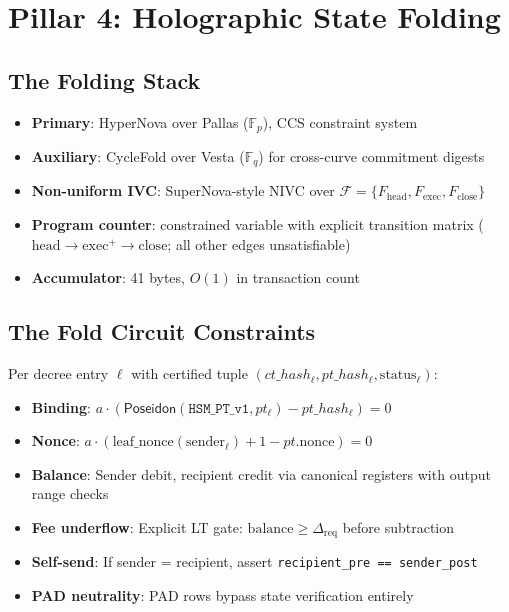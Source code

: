 \documentclass[11pt, a4paper]{article}
\theoremstyle{plain}
\theoremstyle{definition}
\theoremstyle{remark}
\newcommand{\fieldp}{\mathbb{F}_p}
\newcommand{\fieldq}{\mathbb{F}_q}
\begin{document}
\section{Pillar 4: Holographic State Folding}
\label{sec:folding}

\subsection{The Folding Stack}

\begin{itemize}
\item \textbf{Primary}: HyperNova over Pallas ($\fieldp$), CCS
constraint system
\item \textbf{Auxiliary}: CycleFold over Vesta ($\fieldq$) for
cross-curve commitment digests
\item \textbf{Non-uniform IVC}: SuperNova-style NIVC over
 $\mathcal{F} = \{F_{\text{head}}, F_{\text{exec}}, F_{\text{close}}\}$ \item \textbf{Program counter}: constrained variable with explicit
transition matrix ($\text{head} \to \text{exec}^+ \to \text{close}$;
all other edges unsatisfiable)
\item \textbf{Accumulator}: 41 bytes, $O(1)$ in transaction count
\end{itemize}

\subsection{The Fold Circuit Constraints}

Per decree entry $\ell$ with certified tuple
 $(ct\_hash_\ell, pt\_hash_\ell, \text{status}_\ell)$:

\begin{itemize}
\item \textbf{Binding}: $a \cdot (\textsf{Poseidon}(\texttt{HSM\_PT\_v1}, pt_\ell) - pt\_hash_\ell) = 0$ \item \textbf{Nonce}: $a \cdot (\text{leaf\_nonce}(\text{sender}_\ell) + 1 - pt.\text{nonce}) = 0$ \item \textbf{Balance}: Sender debit, recipient credit via canonical
registers with output range checks
\item \textbf{Fee underflow}: Explicit LT gate:
 $\text{balance} \ge \Delta_{\text{req}}$ before subtraction
\item \textbf{Self-send}: If sender = recipient, assert
\texttt{recipient\_pre == sender\_post}
\item \textbf{PAD neutrality}: PAD rows bypass state verification
entirely
\end{itemize}
\end{document}
